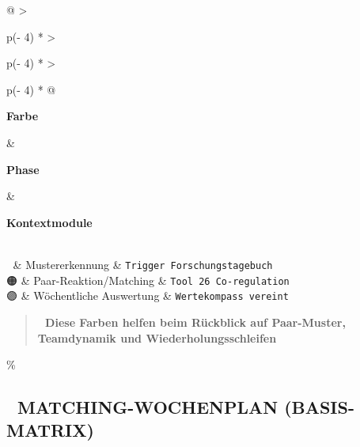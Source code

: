 \begin{longtable}[]{@{}
  >{\raggedright\arraybackslash}p{(\columnwidth - 4\tabcolsep) * }
  >{\raggedright\arraybackslash}p{(\columnwidth - 4\tabcolsep) * }
  >{\raggedright\arraybackslash}p{(\columnwidth - 4\tabcolsep) * }@{}}
\toprule\noalign{}
\begin{minipage}[b]{\linewidth}\raggedright
\textbf{Farbe}
\end{minipage} \& \begin{minipage}[b]{\linewidth}\raggedright
\textbf{Phase}
\end{minipage} \& \begin{minipage}[b]{\linewidth}\raggedright
\textbf{Kontextmodule}
\end{minipage} \\
\midrule\noalign{}
\endhead
\bottomrule\noalign{}
\endlastfoot
🔵 \& Mustererkennung \& \texttt{T}\texttt{rigger}\texttt{\ F}\texttt{orschungstagebuch} \\
🟠 \& Paar-Reaktion/Matching \& \texttt{T}\texttt{ool}\texttt{\ }\texttt{26}\texttt{\ C}\texttt{o}\texttt{-}\texttt{regulation} \\
🟣 \& Wöchentliche Auswertung \& \texttt{W}\texttt{erte}\texttt{k}\texttt{ompass}\texttt{\ }\texttt{vereint} \\
\end{longtable}

\begin{quote}
\textbf{📎 Diese Farben helfen beim Rückblick auf Paar-Muster, Teamdynamik und Wiederholungsschleifen}
\end{quote}

\hypertarget{matching-wochenplan-basis-matrix}{\%
\subsection{\texorpdfstring{📆 \textbf{MATCHING-WOCHENPLAN (BASIS-MATRIX)}}{📆 MATCHING-WOCHENPLAN (BASIS-MATRIX)}}\label{matching-wochenplan-basis-matrix}}

